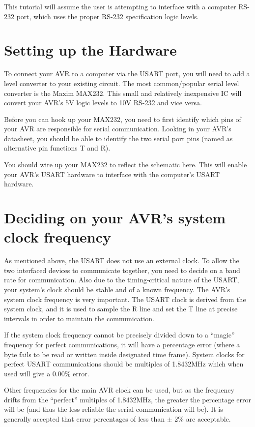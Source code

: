 \documentclass[a4paper,oneside,notitlepage]{book}
\begin{document}
This tutorial will assume the user is attempting to interface with a computer RS-232 port, which uses the proper RS-232 specification logic levels.


\chapter{Setting up the Hardware}

To connect your AVR to a computer via the USART port, you will need to add a level converter to your existing circuit. The most common/popular serial level converter is the Maxim MAX232. This small and relatively inexpensive IC will convert your AVR's 5V logic levels to 10V RS-232 and vice versa.

Before you can hook up your MAX232, you need to first identify which pins of your AVR are responsible for serial communication. Looking in your AVR's datasheet, you should be able to identify the two serial port pins (named as alternative pin functions T and R).

You should wire up your MAX232 to reflect the schematic here. This will enable your AVR's USART hardware to interface with the computer's USART hardware.


\chapter{Deciding on your AVR's system clock frequency}

As mentioned above, the USART does not use an external clock. To allow the two interfaced devices to communicate together, you need to decide on a baud rate for communication. Also due to the timing-critical nature of the USART, your system's clock should be stable and of a known frequency. The AVR's system clock frequency is very important. The USART clock is derived from the system clock, and it is used to sample the R line and set the T line at precise intervals in order to maintain the communication.

If the system clock frequency cannot be precisely divided down to a ``magic'' frequency for perfect communications, it will have a percentage error (where a byte fails to be read or written inside designated time frame). System clocks for perfect USART communications should be multiples of 1.8432MHz which when used will give a 0.00\% error.

Other frequencies for the main AVR clock can be used, but as the frequency drifts from the ``perfect'' multiples of 1.8432MHz, the greater the percentage error will be (and thus the less reliable the serial communication will be). It is generally accepted that error percentages of less than \ensuremath{\pm} 2\% are acceptable.
\end{document}
